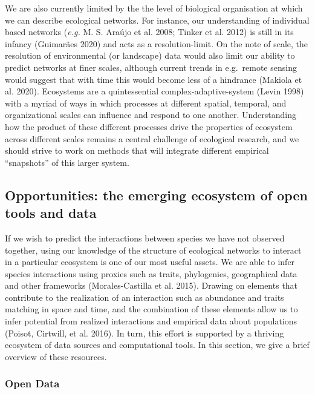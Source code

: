 \documentclass[10pt,oneside]{article}
\begin{document}
We are also currently limited by the the level of biological
organisation at which we can describe ecological networks. For instance,
our understanding of individual based networks (\emph{e.g.} M. S. Araújo
et al. 2008; Tinker et al. 2012) is still in its infancy (Guimarães
2020) and acts as a resolution-limit. On the note of scale, the
resolution of environmental (or landscape) data would also limit our
ability to predict networks at finer scales, although current trends in
e.g.~remote sensing would suggest that with time this would become less
of a hindrance (Makiola et al. 2020). Ecosystems are a quintessential
complex-adaptive-system (Levin 1998) with a myriad of ways in which
processes at different spatial, temporal, and organizational scales can
influence and respond to one another. Understanding how the product of
these different processes drive the properties of ecosystem across
different scales remains a central challenge of ecological research, and
we should strive to work on methods that will integrate different
empirical ``snapshots'' of this larger system.

\hypertarget{opportunities-the-emerging-ecosystem-of-open-tools-and-data}{%
\subsection{Opportunities: the emerging ecosystem of open tools and
data}\label{opportunities-the-emerging-ecosystem-of-open-tools-and-data}}

If we wish to predict the interactions between species we have not
observed together, using our knowledge of the structure of ecological
networks to interact in a particular ecosystem is one of our most useful
assets. We are able to infer species interactions using proxies such as
traits, phylogenies, geographical data and other frameworks
(Morales-Castilla et al. 2015). Drawing on elements that contribute to
the realization of an interaction such as abundance and traits matching
in space and time, and the combination of these elements allow us to
infer potential from realized interactions and empirical data about
populations (Poisot, Cirtwill, et al. 2016). In turn, this effort is
supported by a thriving ecosystem of data sources and computational
tools. In this section, we give a brief overview of these resources.

\hypertarget{open-data}{%
\subsubsection{Open Data}\label{open-data}}
\end{document}

